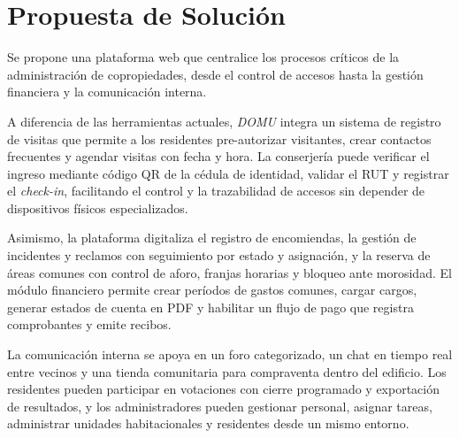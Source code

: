 

\section{Propuesta de Solución}

Se propone una plataforma web que centralice los procesos críticos de la administración de copropiedades, desde el control de accesos hasta la gestión financiera y la comunicación interna.

A diferencia de las herramientas actuales, \textit{DOMU} integra un sistema de registro de visitas que permite a los residentes pre-autorizar visitantes, crear contactos frecuentes y agendar visitas con fecha y hora. La conserjería puede verificar el ingreso mediante código QR de la cédula de identidad, validar el RUT y registrar el \textit{check-in}, facilitando el control y la trazabilidad de accesos sin depender de dispositivos físicos especializados.

Asimismo, la plataforma digitaliza el registro de encomiendas, la gestión de incidentes y reclamos con seguimiento por estado y asignación, y la reserva de áreas comunes con control de aforo, franjas horarias y bloqueo ante morosidad. El módulo financiero permite crear períodos de gastos comunes, cargar cargos, generar estados de cuenta en PDF y habilitar un flujo de pago que registra comprobantes y emite recibos.

La comunicación interna se apoya en un foro categorizado, un chat en tiempo real entre vecinos y una tienda comunitaria para compraventa dentro del edificio. Los residentes pueden participar en votaciones con cierre programado y exportación de resultados, y los administradores pueden gestionar personal, asignar tareas, administrar unidades habitacionales y residentes desde un mismo entorno.


